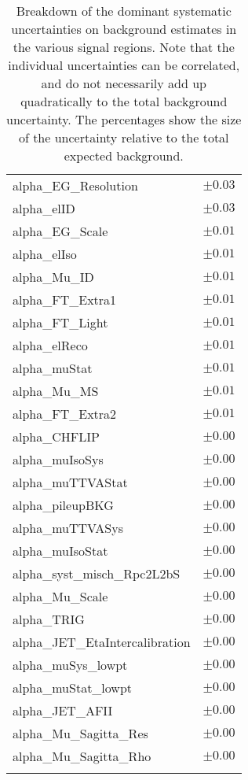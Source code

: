 \begin{table}
\begin{center}
\begin{tabular*}{\textwidth}{@{\extracolsep{\fill}}lc}
alpha\_EG\_Resolution         & $\pm 0.03$       \\
alpha\_elID         & $\pm 0.03$       \\
alpha\_EG\_Scale         & $\pm 0.01$       \\
alpha\_elIso         & $\pm 0.01$       \\
alpha\_Mu\_ID         & $\pm 0.01$       \\
alpha\_FT\_Extra1         & $\pm 0.01$       \\
alpha\_FT\_Light         & $\pm 0.01$       \\
alpha\_elReco         & $\pm 0.01$       \\
alpha\_muStat         & $\pm 0.01$       \\
alpha\_Mu\_MS         & $\pm 0.01$       \\
alpha\_FT\_Extra2         & $\pm 0.01$       \\
alpha\_CHFLIP         & $\pm 0.00$       \\
alpha\_muIsoSys         & $\pm 0.00$       \\
alpha\_muTTVAStat         & $\pm 0.00$       \\
alpha\_pileupBKG         & $\pm 0.00$       \\
alpha\_muTTVASys         & $\pm 0.00$       \\
alpha\_muIsoStat         & $\pm 0.00$       \\
alpha\_syst\_misch\_Rpc2L2bS         & $\pm 0.00$       \\
alpha\_Mu\_Scale         & $\pm 0.00$       \\
alpha\_TRIG         & $\pm 0.00$       \\
alpha\_JET\_EtaIntercalibration         & $\pm 0.00$       \\
alpha\_muSys\_lowpt         & $\pm 0.00$       \\
alpha\_muStat\_lowpt         & $\pm 0.00$       \\
alpha\_JET\_AFII         & $\pm 0.00$       \\
alpha\_Mu\_Sagitta\_Res         & $\pm 0.00$       \\
alpha\_Mu\_Sagitta\_Rho         & $\pm 0.00$       \\
\noalign{\smallskip}\hline\noalign{\smallskip}
\end{tabular*}
\end{center}
\caption[Breakdown of uncertainty on background estimates]{
Breakdown of the dominant systematic uncertainties on background estimates in the various signal regions.
Note that the individual uncertainties can be correlated, and do not necessarily add up quadratically to 
the total background uncertainty. The percentages show the size of the uncertainty relative to the total expected background.
\label{table.results.bkgestimate.uncertainties.Rpc2L2bS}}
\end{table}
\clearpage
%
